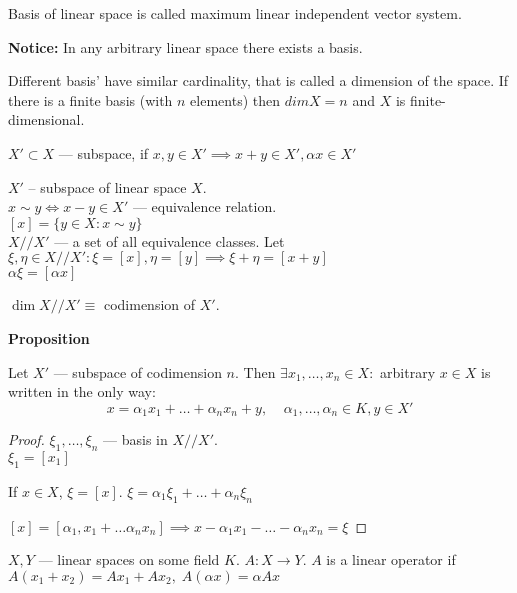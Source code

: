 \begin{definition}
  Basis of linear space is called maximum linear independent vector system.
\end{definition}

\textbf{Notice:} In any arbitrary linear space there exists a basis.

Different basis' have similar cardinality, that is called a dimension of the space.
If there is a finite basis (with $n$ elements) then $dim X = n$ and $X$ is finite-dimensional.

\begin{definition}
  $X' \subset X$ --- subspace, if $x, y \in  X' \implies x + y \in  X',  \alpha x \in  X'$
\end{definition}

  $X'$ -- subspace of linear space $X$.\\
  $x \sim y \iff x - y \in  X'$ --- equivalence relation.\\
  $[x] = \{y \in  X: x \sim y\} $ \\
  $X // X'$ --- a set of all equivalence classes.
  Let $\xi, \eta \in  X // X': \xi = [x], \eta = [y] \implies \xi + \eta = [x + y]$\\
  $\alpha \xi = [\alpha x]$

  $\operatorname{dim} X // X' \equiv$ codimension of  $X'$.

  \textbf{Proposition}
  \begin{proposition}
    Let $X'$ --- subspace of codimension $n$. Then
    $\exists x_1, \ldots, x_n \in  X:$ arbitrary $x \in  X$ is written in the only way:
    \[ x = \alpha_1 x_1 + \ldots + \alpha_n x_n + y, \;\;\;\; \alpha_1, \ldots, \alpha_n \in  K, y \in  X' \] 
  \end{proposition}


  \begin{proof}
    $\xi_1, \ldots, \xi_n$ --- basis in $X // X'$.\\
    $\xi_1 = [x_1]$

     If  $x \in  X$, $\xi = [x]$. $\xi = \alpha_1 \xi_1 + \ldots + \alpha_n \xi_n$ 

     $[x] = [\alpha_1, x_1 + \ldots \alpha_n x_n] \implies x - \alpha_1 x_1 - \ldots - \alpha_n x_n = \xi $
  \end{proof}

  \begin{definition}
    $X,Y$ --- linear spaces on some field $K$.
    $A: X \to  Y$. $A$ is a linear operator if $A(x_1 + x_2) = A x_1 + A x_2, \; A(\alpha x) = \alpha Ax$
  \end{definition}

